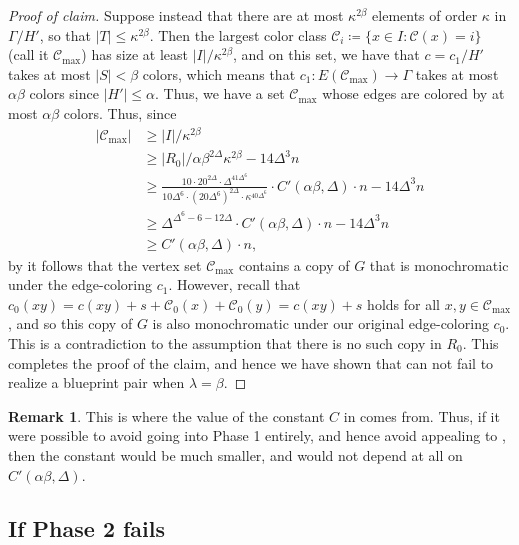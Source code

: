 \documentclass{article}
\newcommand{\cC}{\mathcal{C} }
\theoremstyle{definition}
\newtheorem{remark}[theorem]{Remark}
\newenvironment{subproof}[1][\proofname]{%
  \renewcommand{\qedsymbol}{$\blacksquare$}%
  \begin{proof}[#1]%
}{%
  \end{proof}%
}
\begin{document}
\begin{subproof}[Proof of claim]
Suppose instead that there are at most $\kappa^{2\beta}$ elements of order $\kappa$ in $\Gamma/H'$, so that $|T|\leq \kappa^{2\beta}$. Then the largest color class $\cC_i\coloneqq \{x\in I:\cC(x)=i\}$ (call it $\cC_{\text{max}}$) has size at least $|I|/\kappa^{2\beta}$, and on this set, we have that $c=c_1/H'$ takes at most $|S|<\beta$ colors, which means that $c_1:E(\cC_{\text{max}})\to \Gamma$ takes at most $\alpha\beta$ colors since $|H'|\leq \alpha$. Thus, we have a set $\cC_{\text{max}}$ whose edges are colored by at most $\alpha\beta$ colors.
Thus, since $$\begin{aligned}
|\cC_{\text{max}}|&\ge |I|/\kappa^{2\beta}\\
&\geq |R_0|/\alpha\beta^{2\Delta}\kappa^{2\beta} - 14\Delta^3n\\
&\ge \frac{10\cdot 20^{2\Delta}\cdot \Delta^{41\Delta^6}}{10\Delta^6\cdot (20\Delta^6)^{2\Delta}\cdot \kappa^{40\Delta^6}}\cdot C'(\alpha\beta,\Delta) \cdot n - 14\Delta^3n\\
&\ge \Delta^{\Delta^6-6-12\Delta}\cdot C'(\alpha\beta,\Delta) \cdot n - 14\Delta^3n \\
&\ge C'(\alpha\beta,\Delta)\cdot n,
\end{aligned}$$ by  it follows that the vertex set $\cC_{\text{max}}$ contains a copy of $G$ that is monochromatic under the edge-coloring $c_1$. However, recall that $c_0(xy)=c(xy)+s+\cC_0(x)+\cC_0(y)=c(xy)+s$ holds for all $x, y\in\cC_{\text{max}}$, and so this copy of $G$ is also monochromatic under our original edge-coloring $c_0$. This is a contradiction to the assumption that there is no such copy in $R_0$. This completes the proof of the claim, and hence we have shown that  can not fail to realize a blueprint pair when $\lambda = \beta$.
\end{subproof}

\begin{remark}
    This is where the value of the constant $C$ in  comes from. Thus, if it were possible to avoid going into Phase 1 entirely, and hence avoid appealing to , then the constant would be much smaller, and would not depend at all on $C'(\alpha\beta,\Delta)$.
\end{remark}

\subsection{If Phase 2 fails}\label{phase_2}
\end{document}
